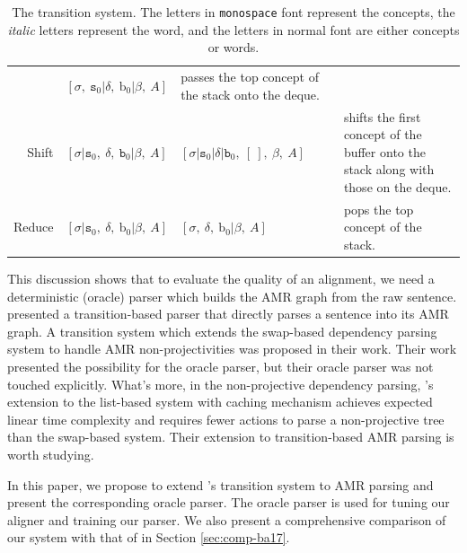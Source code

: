 \documentclass[11pt,a4paper]{article}
\begin{document}
\begin{table}[t]
\begin{tabular}{rllp{16em}}
		& $[\sigma,\ \texttt{s}_0 | \delta,\ \text{b}_0 | \beta,\ A]$ 
		& passes the top concept of the stack onto the deque. \\[0.5ex]
		\hdashline
		{\sc Shift} 
		& $[\sigma | \texttt{s}_0,\ \delta,\ \texttt{b}_0 | \beta,\ A]$
		& $[\sigma | \texttt{s}_0 | \delta | \texttt{b}_0,\ [\ ],\ \beta,\ A]$ 
		&  shifts the first concept of the buffer onto the stack along
		with those on the deque.\\[0.5ex]
		\hdashline
		{\sc Reduce}
		& $[\sigma | \texttt{s}_0,\ \delta ,\ \text{b}_0 | \beta,\ A]$ 
		& $[\sigma,\ \delta,\ \text{b}_0 | \beta,\ A]$
		& pops the top concept of the stack. \\
	\end{tabular}
	\caption{The transition system. 
		The letters in {\tt monospace} font represent the concepts,
		the {\it italic} letters represent the word, and the 
		letters in normal font are either concepts or words.}\label{tbl:trans-sys}
\end{table}

This discussion shows that to evaluate the quality of
an alignment, we need a deterministic (oracle) parser which
builds the AMR graph from the raw sentence.
\citet{ballesteros-alonaizan:2017:EMNLP2017} presented a 
transition-based parser that directly parses a sentence into its AMR graph.
A transition system
which extends the swap-based dependency parsing system
to handle AMR non-projectivities \cite{damonte-cohen-satta:2017:EACLlong}
was proposed in their work.
Their work presented the possibility for the oracle parser,
but their oracle parser was not touched explicitly.
What's more, in the non-projective dependency parsing,
\citet{choi-mccallum:2013:ACL2013}'s extension to the list-based system \cite{nivre2008algorithms}
with caching mechanism achieves expected linear time complexity and
requires fewer actions to parse a non-projective tree than the swap-based system.
Their extension to transition-based AMR parsing is worth studying.

In this paper, we propose to extend \citet{choi-mccallum:2013:ACL2013}'s transition system to AMR parsing
and present the corresponding oracle parser.
The oracle parser is used for tuning our aligner and training our parser.
We also present a comprehensive comparison of our system with that of 
\citet{ballesteros-alonaizan:2017:EMNLP2017} in Section \ref{sec:comp-ba17}.
\end{document}
